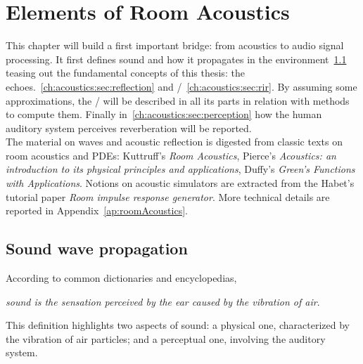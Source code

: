 \chapter{Elements of Room Acoustics}\label{chap:acoustics}
\vspace{-2.5em}
This chapter will build a first important bridge: from acoustics to audio signal processing.
It first defines sound and how it propagates in the environment~\cref{ch:acoustics:sec:wave} teasing out the fundamental concepts of this thesis: the echoes.~\cref{ch:acoustics:sec:reflection} and \RIRdef/~\cref{ch:acoustics:sec:rir}.
By assuming some approximations, the \RIR/ will be described in all its parts in relation with methods to compute them.
Finally in~\cref{ch:acoustics:sec:perception} how the human auditory system perceives reverberation will be reported.
\\The material on waves and acoustic reflection is digested from classic texts on room acoustics and PDEs:
Kuttruff’s \textit{Room Acoustics}, Pierce's \textit{Acoustics: an introduction to its physical principles and applications}, Duffy’s \textit{Green’s Functions with Applications}.
Notions on acoustic simulators are extracted from the Habet's tutorial paper \textit{Room impulse response generator}.
More technical details are reported in Appendix~\ref{ap:roomAcoustics}.

\section{Sound wave propagation}\label{ch:acoustics:sec:wave}%
According to common dictionaries and encyclopedias,
\begin{center}
    \textit{sound is the sensation perceived by the ear caused by the vibration of air}.
\end{center}
This definition highlights two aspects of sound: a physical one, characterized by the vibration of air particles; and a perceptual one, involving the auditory system.

